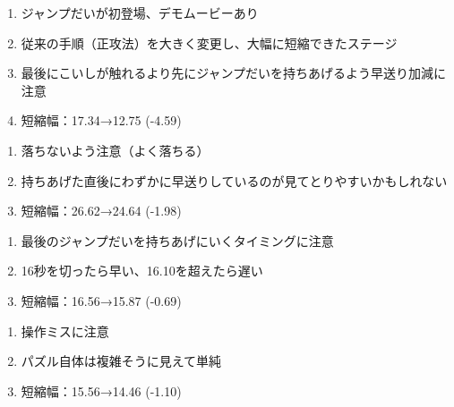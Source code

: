 \begin{enumerate}[label={\sarrow}]
\item ジャンプだいが初登場、デモムービーあり
\item 従来の手順（正攻法）を大きく変更し、大幅に短縮できたステージ
\item 最後にこいしが触れるより先にジャンプだいを持ちあげるよう早送り加減に注意
\item 短縮幅：17.34→12.75 (-4.59)
\end{enumerate}



\begin{enumerate}[label={\sarrow}]
\item 落ちないよう注意（よく落ちる）
\item 持ちあげた直後にわずかに早送りしているのが見てとりやすいかもしれない
\item 短縮幅：26.62→24.64 (-1.98)
\end{enumerate}



\begin{enumerate}[label={\sarrow}]
\item 最後のジャンプだいを持ちあげにいくタイミングに注意
\item 16秒を切ったら早い、16.10を超えたら遅い
\item 短縮幅：16.56→15.87 (-0.69)
\end{enumerate}



\begin{enumerate}[label={\sarrow}]
\item 操作ミスに注意
\item パズル自体は複雑そうに見えて単純
\item 短縮幅：15.56→14.46 (-1.10)
\end{enumerate}



